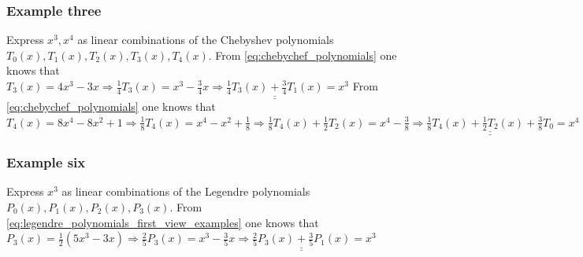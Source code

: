 \subsubsection{Example three} \label{subsub:Example_cheby}
Express $x^3,x^4$ as linear combinations of the Chebyshev polynomials $T_0(x), T_1(x), T_2(x), T_3(x), T_4(x)$. \newline\newline
From \autoref{eq:chebychef_polynomials} one knows that $T_3(x)=4 x^3-3 x \Rightarrow \frac{1}{4}T_3(x)=x^3-\frac{3}{4}x \Rightarrow \underline{\underline{\frac{1}{4}T_3(x)+\frac{3}{4}T_1(x)}}=x^3$\newline\newline\newline
From \autoref{eq:chebychef_polynomials} one knows that $T_4(x)=8 x^4-8 x^2+1 \Rightarrow \frac{1}{8}T_4(x)=x^4-x^2+\frac{1}{8} \Rightarrow \frac{1}{8}T_4(x)+\frac{1}{2}T_2(x)=x^4-\frac{3}{8}\Rightarrow \underline{\underline{\frac{1}{8}T_4(x)+\frac{1}{2}T_2(x)+\frac{3}{8}T_0}}=x^4$

\subsubsection{Example six}
Express $x^3$ as linear combinations of the Legendre polynomials $P_0(x), P_1(x), P_2(x), P_3(x)$. \newline
From \autoref{eq:legendre_polynomials_first_view_examples} one knows that $P_3(x)=\frac{1}{2}\left(5 x^3-3 x\right) \Rightarrow \frac{2}{5}P_3(x)=x^3-\frac{3}{5}x \Rightarrow \underline{\underline{\frac{2}{5}P_3(x)+\frac{3}{5}P_1(x)}}=x^3$
